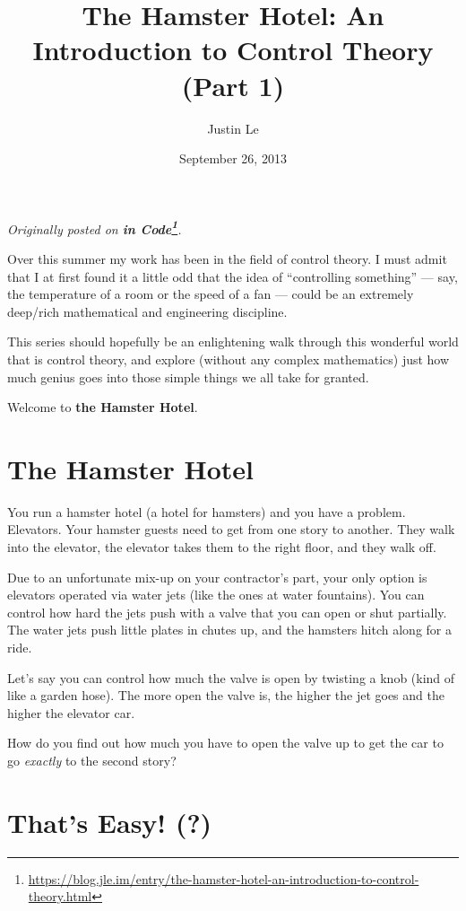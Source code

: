 \documentclass[]{article}
\title{The Hamster Hotel: An Introduction to Control Theory (Part 1)}
\author{Justin Le}
\date{September 26, 2013}
\renewcommand{\href}[2]{#2\footnote{\url{#1}}}
\begin{document}
\maketitle

\emph{Originally posted on
\textbf{\href{https://blog.jle.im/entry/the-hamster-hotel-an-introduction-to-control-theory.html}{in
Code}}.}

Over this summer my work has been in the field of control theory. I must admit
that I at first found it a little odd that the idea of ``controlling something''
--- say, the temperature of a room or the speed of a fan --- could be an
extremely deep/rich mathematical and engineering discipline.

This series should hopefully be an enlightening walk through this wonderful
world that is control theory, and explore (without any complex mathematics) just
how much genius goes into those simple things we all take for granted.

Welcome to \textbf{the Hamster Hotel}.

\hypertarget{the-hamster-hotel}{%
\section{The Hamster Hotel}\label{the-hamster-hotel}}

You run a hamster hotel (a hotel for hamsters) and you have a problem.
Elevators. Your hamster guests need to get from one story to another. They walk
into the elevator, the elevator takes them to the right floor, and they walk
off.

Due to an unfortunate mix-up on your contractor's part, your only option is
elevators operated via water jets (like the ones at water fountains). You can
control how hard the jets push with a valve that you can open or shut partially.
The water jets push little plates in chutes up, and the hamsters hitch along for
a ride.

Let's say you can control how much the valve is open by twisting a knob (kind of
like a garden hose). The more open the valve is, the higher the jet goes and the
higher the elevator car.

How do you find out how much you have to open the valve up to get the car to go
\emph{exactly} to the second story?

\hypertarget{thats-easy}{%
\section{That's Easy! (?)}\label{thats-easy}}
\end{document}
